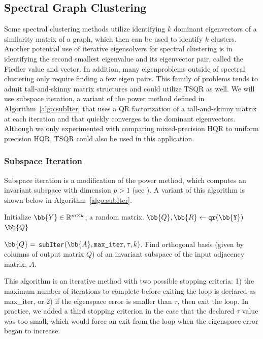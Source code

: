 \subsection{Spectral Graph Clustering}
\label{sec:cluster}
Some spectral clustering methods utilize identifying $k$ dominant eigenvectors of a similarity matrix of a graph, which then can be used to identify $k$ clusters. 
Another potential use of iterative eigensolvers for spectral clustering is in identifying the second smallest eigenvalue and its eigenvector pair, called the Fiedler value and vector.
In addition, many eigenproblems outside of spectral clustering only require finding a few eigen pairs.
This family of problems tends to admit tall-and-skinny matrix structures and could utilize TSQR as well. 
We will use subspace iteration, a variant of the power method defined in Algorithm~\ref{algo:subIter} that uses a QR factorization of a tall-and-skinny matrix at each iteration and that quickly converges to the dominant eigenvectors.
Although we only experimented with comparing mixed-precision HQR to uniform precision HQR, TSQR could also be used in this application. 
\par

\subsubsection{Subspace Iteration}
Subspace iteration is a modification of the power method, which computes an invariant subspace with dimension $p > 1$ (see \cite{Bai2000}).
A variant of this algorithm is shown below in Algorithm~\ref{algo:subIter}.

\begin{algorithm2e}
	\DontPrintSemicolon %
	Initialize $\bb{Y}\in \mathbb{R}^{m\times k}$, a random matrix.
	$\bb{Q}, \bb{R}\gets \tt{qr}(\bb{Y})$ 
	\Return $\bb{Q}$
	\caption{$\bb{Q}=$ {\tt subIter}$(\bb{A}, \text{\tt max\_iter}, \tau, k)$. Find orthogonal basis (given by columns of output matrix $Q$) of an invariant subspace of the input adjacency matrix, $A$.}
	\label{algo:subIter}
\end{algorithm2e}
This algorithm is an iterative method with two possible stopping criteria: 1) the maximum number of iterations to complete before exiting the loop is declared as max\_iter, or 2) if the eigenspace error is smaller than $\tau$, then exit the loop.
In practice, we added a third stopping criterion in the case that the declared $\tau$ value was too small, which would force an exit from the loop when the eigenspace error began to increase.

